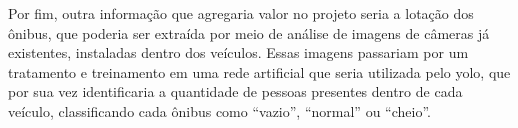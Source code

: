 \indent
\par Por fim, outra informação que agregaria valor no projeto seria a lotação dos ônibus, que poderia ser extraída por meio de análise de imagens de câmeras já existentes, instaladas dentro dos veículos. Essas imagens passariam por um tratamento e treinamento em uma rede artificial que seria utilizada pelo yolo, que por sua vez identificaria a quantidade de pessoas presentes dentro de cada veículo, classificando cada ônibus como “vazio”, “normal” ou “cheio”.




